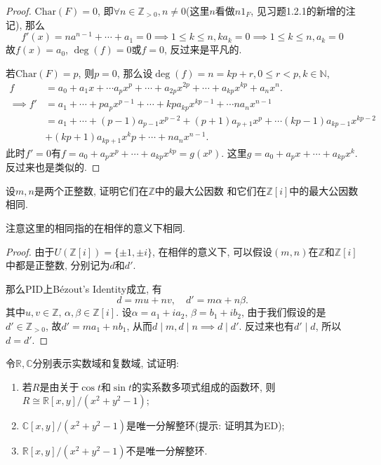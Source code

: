 \documentclass{../solutions-cn}
\begin{document}
\begin{proof}
    $\mathrm{Char}(F) = 0$, 即$\forall n \in \mathbb{Z}_{>0}, n \neq 0$(这里$n$看做$n1_F$, 见习题1.2.1的新增的注记), 那么
\[
    f'(x) = na^{n - 1} + \cdots + a_1 = 0 \implies 1 \leqslant k \leqslant n, ka_k = 0 \implies 1 \leqslant k \leqslant n, a_k = 0
\]
故$f(x) = a_0$, $\deg(f) = 0$或$f = 0$, 反过来是平凡的.

    若$\mathrm{Char}(F) = p$, 则$p = 0$, 那么设$\deg(f) = n = kp + r, 0 \leqslant r < p, k \in \mathbb{N}$,
\[
\begin{aligned}
    f &= a_0 + a_1x + \cdots a_px^p + \cdots + a_{2p}x^{2p} + \cdots + a_{kp}x^{kp} + a_nx^n.\\
    \implies f' &= a_1 + \cdots + pa_px^{p - 1} + \cdots + kpa_{kp}x^{kp - 1} + \cdots na_nx^{n - 1}\\
    &= a_1 + \cdots + (p - 1)a_{p - 1}x^{p - 2} + (p + 1)a_{p + 1}x^p + \cdots (kp - 1)a_{kp - 1}x^{kp - 2}\\
    &+ (kp + 1)a_{kp + 1}x^kp + \cdots + na_nx^{n - 1}.
\end{aligned}
\]
此时$f' = 0$有$f = a_0 + a_px^p + \cdots + a_{kp}x^{kp} = g(x^p)$. 这里$g = a_0 + a_px + \cdots + a_{kp}x^k$. 反过来也是类似的.
\end{proof}

\begin{exercise}[习题2.2.1]
    设$m, n$是两个正整数, 证明它们在$\mathbb{Z}$中的最大公因数
和它们在$\mathbb{Z}[i]$中的最大公因数相同.
\end{exercise}

注意这里的相同指的在相伴的意义下相同.

\begin{proof}
    由于$U(\mathbb{Z}[i]) = \{\pm 1, \pm i\}$, 在相伴的意义下, 可以假设$(m, n)$在$\mathbb{Z}$和$\mathbb{Z}[i]$中都是正整数, 分别记为$d$和$d'$.

    那么PID上Bézout's Identity成立, 有
    \[
        d = mu + nv,\quad d' = m\alpha + n\beta.
    \]
    其中$u, v \in \mathbb{Z},\, \alpha, \beta \in \mathbb{Z}[i]$. 设$\alpha = a_1 + ia_2,\, \beta = b_1 + ib_2$, 由于我们假设的是$d' \in \mathbb{Z}_{>0}$, 故$d' = ma_1 + nb_1$, 从而$d \mid m, d \mid n \implies d \mid d'$. 反过来也有$d' \mid d$, 所以$d = d'$.
\end{proof}

\begin{exercise}[习题2.2.6]
    令$\mathbb{R}, \mathbb{C}$分别表示实数域和复数域, 试证明: 
\begin{enumerate}[(1)]
    \item 若$R$是由关于$\cos t$和$\sin t$的实系数多项式组成的函数环, 
则$R \cong \mathbb{R}[x, y]/(x^2 + y^2 - 1)$;
    \item $\mathbb{C}[x, y]/(x^2 + y^2 - 1)$是唯一分解整环(提示: 证明其为ED);
    \item $\mathbb{R}[x, y]/(x^2 + y^2 - 1)$不是唯一分解整环.
\end{enumerate}
\end{exercise}
\end{document}
